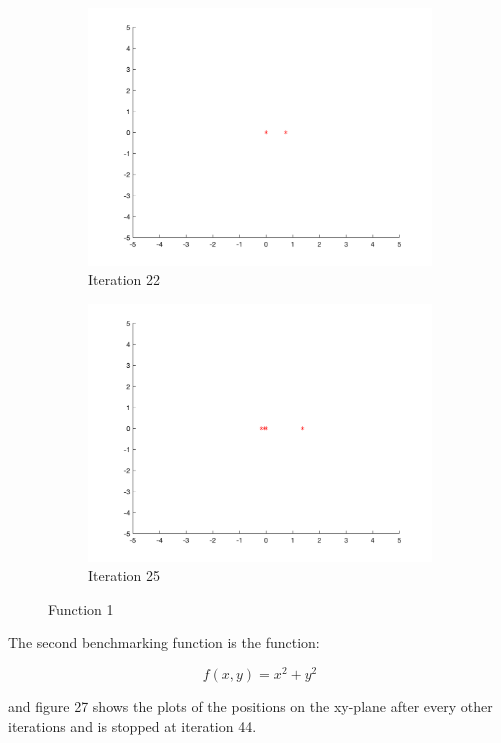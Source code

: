 \begin{figure}
\begin{subfigure}[b]{0.4\textwidth}
    \includegraphics[width=\textwidth]{img/smpl/circ/loa-iter-22}
    \caption{Iteration 22}
    \label{fig:s1-iter-6}
  \end{subfigure}
  \begin{subfigure}[b]{0.4\textwidth}
    \includegraphics[width=\textwidth]{img/smpl/circ/loa-iter-25}
    \caption{Iteration 25}
    \label{fig:s1-iter-7}
  \end{subfigure}
  \caption{Function 1}
\end{figure}

The second benchmarking function is the function:

$$
  f(x, y) = x^2 + y^2
$$

and figure 27 shows the plots of the positions on the xy-plane after every other iterations and is stopped at iteration 44.

